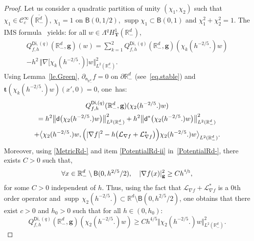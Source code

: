 \documentclass[10pt]{amsart}
\newcommand{\mbf}[1]{\mathbf{#1}}
\let\lp\langle
\let\rp\rangle
\DeclareMathOperator\supp{supp}
\theoremstyle{plain}
\theoremstyle{definition}
\begin{document}
\begin{proof}
Let us consider a quadratic partition of unity $(\chi_1,\chi_2)$ such that
$\chi_1\in \mathcal C_c^\infty (\overline {\mathbb R_-^d})$,
$\chi_1=1$ on $\mathsf B(0,1/2)$, $\supp \chi_1\subset \mathsf
B(0,1)$ and $\chi_1^2+\chi_2^2=1$. The IMS
formula~\cite{CFKS,helffer-nier-06} yields: for all $ w\in \Lambda^qH_{\mbf T}^1(\mathbb R^d_-)$,\vspace*{-5pt}
\begin{multline}
\label{eq.IMS}
Q_{f,h}^{\mathsf{Di},(q)}(\mathbb R^d_-,\mbf g)(w) =\sum_{k=1}^2
Q_{f,h}^{\mathsf{Di},(q)}(\mathbb R^d_-,\mbf g)(\chi_k(h^{-2/5
}.)w)\\[-8pt]
- h^2\,\big \Vert \nabla\big[ \chi_k(h^{-2/5 }.) \big]w\big \Vert_{L^2(\mathbb R_-^d)}^2.
\end{multline}
Using Lemma~\ref{le.Green}, $\partial_{\mathsf n_{\mathbb
R^{d}_-}}f=0$ on $\partial \mathbb R^{d}_-$ (see~\eqref{eq.stable}) and $\mbf t (\chi_k(h^{-2/5 }.)w)(x',0)=0$, one~has:\vspace*{-5pt}
\begin{multline*}
Q_{f,h}^{\mathsf{Di},(q)}(\mathbb R^d_-,\mbf g)(\chi_2(h^{-2/5
}.)w)\\
=h^2\big \Vert \mathsf d \bigl(\chi_2(h^{-2/5 }.)w\bigr)\big \Vert_{L^2(\mathbb R^d_-)}^2 + h^2\big \Vert \mathsf d^*\bigl(\chi_2(h^{-2/5 }.)w\bigr)\big \Vert_{L^2(\mathbb R^d_-)}^2 \\
+\big \lp \chi_2(h^{-2/5 }.)w, \Bigl(\vert \nabla f\vert^2 -h\bigl(\mathcal L_{\nabla f}+\mathcal L_{\nabla f}^*\bigr)\Bigr)\chi_2(h^{-2/5 }.)w\big \rp_{L^2(\mathbb R^d_-)}.
\end{multline*}
Moreover, using \ref{MetricRd-} and item \eqref{PotentialRd-ii} in~\ref{PotentialRd-}, there exists $C>0$ such that,
\begin{equation}\label{eq.gradientup}
\forall x\in \mathbb R^d_-\setminus \mathsf B(0,h^{2/5 }/2), \quad \vert \nabla f(x)\vert^2_{{\mbf g}} \ge Ch^{\sfrac 45},
\end{equation}
for some $C>0$ independent of $h$. Thus, using the fact that $\mathcal L_{\nabla f}+\mathcal L_{\nabla f}^*$ is a $0$th order operator and $\supp\, \chi_2(h^{-2/5 }.)\subset \mathbb R^d\setminus \mathsf B(0,h^{2/5 }/2)$, one obtains that there exist $c>0$ and $h_0>0$ such that for all $h\in (0,h_0)$:
\begin{equation}\label{eq.chi_2-Q}
Q_{f,h}^{\mathsf{Di},(q)}(\mathbb R^d_-,\mbf g)(\chi_2(h^{-2/5 }.)w)\ge Ch^{4/5} \Vert \chi_2(h^{-2/5 }.) w \Vert_{L^2(\mathbb R_-^d)}^2.
\end{equation}

\end{proof}
\end{document}
